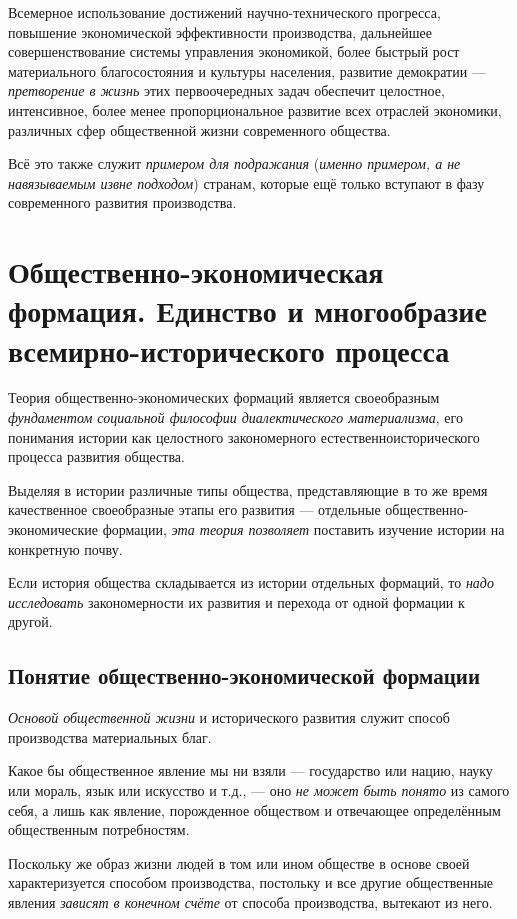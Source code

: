 \documentclass[a4paper,14pt,russian]{extreport}
\begin{document}
Всемерное использование достижений научно-технического прогресса, повышение экономической эффективности производства, дальнейшее совершенствование системы управления экономикой, более быстрый рост материального благосостояния и культуры населения, развитие демократии --- \emph{претворение в жизнь} этих первоочередных задач обеспечит целостное, интенсивное, более менее пропорциональное развитие всех отраслей экономики, различных сфер общественной жизни современного общества.

Всё это также служит \emph{примером для подражания} (\emph{именно примером, а не навязываемым извне подходом}) странам, которые ещё только вступают в фазу современного развития производства.

\section{Общественно-экономическая формация. Единство и многообразие всемирно-исторического процесса}

Теория общественно-экономических формаций является своеобразным \emph{фундаментом социальной философии диалектического материализма}, его понимания истории как целостного закономерного естественноисторического процесса развития общества.

Выделяя в истории различные типы общества, представляющие в то же время качественное своеобразные этапы его развития --- отдельные общественно-экономические формации, \emph{эта теория позволяет} поставить изучение истории на конкретную почву.

Если история общества складывается из истории отдельных формаций, то \emph{надо исследовать} закономерности их развития и перехода от одной формации к другой.

\subsection{Понятие общественно-экономической формации}

\emph{Основой общественной жизни} и исторического развития служит способ производства материальных благ.

Какое бы общественное явление мы ни взяли --- государство или нацию, науку или мораль, язык или искусство и т.д., --- оно \emph{не может быть понято} из самого себя, а лишь как явление, порожденное обществом и отвечающее определённым общественным потребностям.

Поскольку же образ жизни людей в том или ином обществе в основе своей характеризуется способом производства, постольку и все другие общественные явления \emph{зависят в конечном счёте} от способа производства, вытекают из него.
\end{document}
